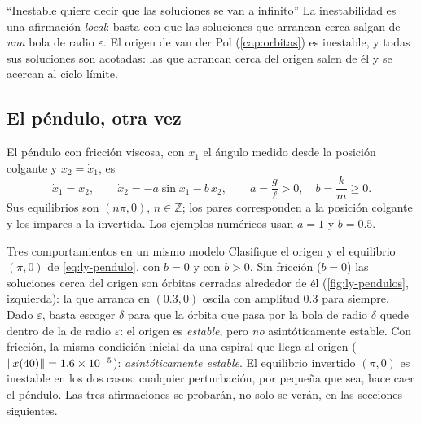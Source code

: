 
\begin{trampa}[label=tr:ly-escape]{``Inestable quiere decir que las soluciones se van a infinito''}
La inestabilidad es una afirmación \emph{local}: basta con que las soluciones que arrancan cerca salgan de \emph{una} bola de radio $\varepsilon$. El origen de van der Pol (\cref{cap:orbitas}) es inestable, y todas sus soluciones son acotadas: las que arrancan cerca del origen salen de él y se acercan al ciclo límite.
\end{trampa}

\subsection{El péndulo, otra vez}

El péndulo con fricción viscosa, con $x_1$ el ángulo medido desde la posición colgante y $x_2=\dot x_1$, es
\begin{equation}
  \dot x_1=x_2,\qquad \dot x_2=-a\sin x_1-b\,x_2,\qquad a=\frac g\ell>0,\quad b=\frac km\ge0 .
  \label{eq:ly-pendulo}
\end{equation}
Sus equilibrios son $(n\pi,0)$, $n\in\mathbb Z$; los pares corresponden a la posición colgante y los impares a la invertida. Los ejemplos numéricos usan $a=1$ y $b=0.5$.

\begin{ejemplo}[label=ej:ly-pendulos]{Tres comportamientos en un mismo modelo}
Clasifique el origen y el equilibrio $(\pi,0)$ de \eqref{eq:ly-pendulo}, con $b=0$ y con $b>0$.
\solucion Sin fricción ($b=0$) las soluciones cerca del origen son órbitas cerradas alrededor de él (\cref{fig:ly-pendulos}, izquierda): la que arranca en $(0.3,0)$ oscila con amplitud $0.3$ para siempre. Dado $\varepsilon$, basta escoger $\delta$ para que la órbita que pasa por la bola de radio $\delta$ quede dentro de la de radio $\varepsilon$: el origen es \emph{estable}, pero \emph{no} asintóticamente estable. Con fricción, la misma condición inicial da una espiral que llega al origen ($\left\lVert x(40)\right\rVert=1.6\times10^{-5}$): \emph{asintóticamente estable}. El equilibrio invertido $(\pi,0)$ es inestable en los dos casos: cualquier perturbación, por pequeña que sea, hace caer el péndulo. Las tres afirmaciones se probarán, no solo se verán, en las secciones siguientes.
\end{ejemplo}

